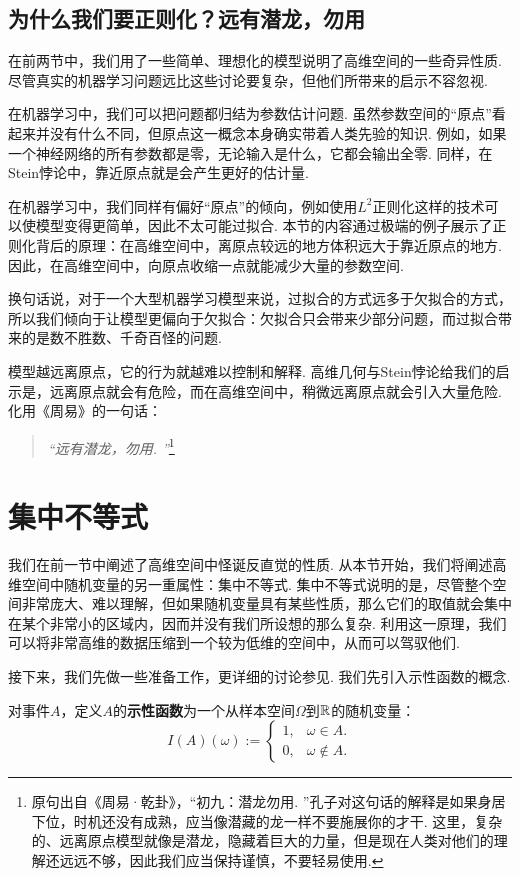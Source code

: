 \subsection{为什么我们要正则化？远有潜龙，勿用}

在前两节中，我们用了一些简单、理想化的模型说明了高维空间的一些奇异性质. 尽管真实的机器学习问题远比这些讨论要复杂，但他们所带来的启示不容忽视. 

在机器学习中，我们可以把问题都归结为参数估计问题. 虽然参数空间的“原点”看起来并没有什么不同，但原点这一概念本身确实带着人类先验的知识. 例如，如果一个神经网络的所有参数都是零，无论输入是什么，它都会输出全零. 同样，在Stein悖论中，靠近原点就是会产生更好的估计量. 

在机器学习中，我们同样有偏好“原点”的倾向，例如使用$L^2$正则化这样的技术可以使模型变得更简单，因此不太可能过拟合. 本节的内容通过极端的例子展示了正则化背后的原理：在高维空间中，离原点较远的地方体积远大于靠近原点的地方. 因此，在高维空间中，向原点收缩一点就能减少大量的参数空间. 

换句话说，对于一个大型机器学习模型来说，过拟合的方式远多于欠拟合的方式，所以我们倾向于让模型更偏向于欠拟合：欠拟合只会带来少部分问题，而过拟合带来的是数不胜数、千奇百怪的问题. 

模型越远离原点，它的行为就越难以控制和解释. 高维几何与Stein悖论给我们的启示是，远离原点就会有危险，而在高维空间中，稍微远离原点就会引入大量危险. 化用《周易》的一句话：
\begin{quotation}
    \emph{“远有潜龙，勿用. ”}\footnote{原句出自《周易·乾卦》，“初九：潜龙勿用. ”孔子对这句话的解释是如果身居下位，时机还没有成熟，应当像潜藏的龙一样不要施展你的才干. 这里，复杂的、远离原点模型就像是潜龙，隐藏着巨大的力量，但是现在人类对他们的理解还远远不够，因此我们应当保持谨慎，不要轻易使用. }
\end{quotation}

\section{集中不等式}

我们在前一节中阐述了高维空间中怪诞反直觉的性质. 从本节开始，我们将阐述高维空间中随机变量的另一重属性：集中不等式. 集中不等式说明的是，尽管整个空间非常庞大、难以理解，但如果随机变量具有某些性质，那么它们的取值就会集中在某个非常小的区域内，因而并没有我们所设想的那么复杂. 利用这一原理，我们可以将非常高维的数据压缩到一个较为低维的空间中，从而可以驾驭他们. 

接下来，我们先做一些准备工作，更详细的讨论参见. 我们先引入示性函数的概念.
\begin{definition}[示性函数]\label{def:indicator-function}
    对事件$A$，定义$A$的\textbf{示性函数}为一个从样本空间$\Omega$到$\mathbb{R}$的随机变量：
\begin{equation*}
    I(A)(\omega) := 
    \begin{cases}
        1,& \omega \in A. \\
        0,& \omega \notin A.
    \end{cases}
\end{equation*}
\end{definition}

